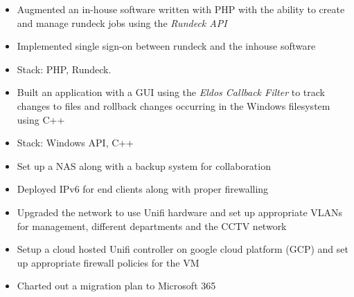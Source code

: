 \documentclass[10pt,a4paper]{altacv}
\begin{document}
\begin{itemize}
    \item Augmented an in-house software written with PHP with the ability to create and manage rundeck jobs using the \emph{Rundeck API}
    \item Implemented single sign-on between rundeck and the inhouse software
    \item Stack: PHP, Rundeck.
\end{itemize}
\divider

\begin{itemize}
    \item Built an application with a GUI using the \emph{Eldos Callback Filter} to track changes to files and rollback changes occurring in the Windows filesystem using C++
    \item Stack: Windows API, C++
\end{itemize}
\divider


\begin{itemize}
    \item Set up a NAS along with a backup system for collaboration
    \item Deployed IPv6 for end clients along with proper firewalling
    \item Upgraded the network to use Unifi hardware
    and set up appropriate VLANs for management, different departments and the CCTV network
    \item Setup a cloud hosted Unifi controller on google cloud platform (GCP) and set up appropriate firewall policies for the VM
    \item Charted out a migration plan to Microsoft 365
\end{itemize}
\end{document}
